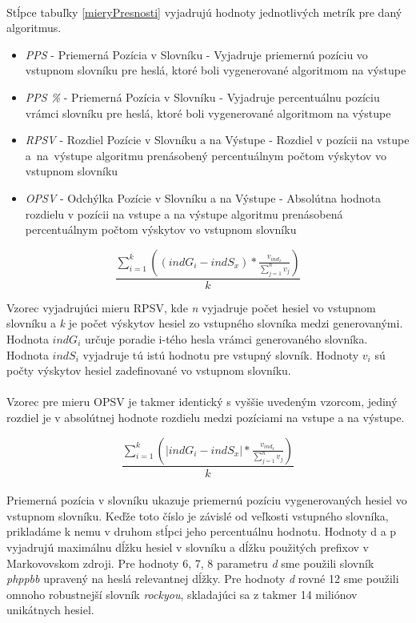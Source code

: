 \paragraph{}
Stĺpce tabuľky \ref{mieryPresnosti} vyjadrujú hodnoty jednotlivých metrík pre daný algoritmus.
\begin{itemize}
	\item \emph{PPS} - Priemerná Pozícia v Slovníku - Vyjadruje priemernú pozíciu vo vstupnom slovníku pre heslá, ktoré boli vygenerované algoritmom na výstupe
	\item \emph{PPS \%} - Priemerná Pozícia v Slovníku - Vyjadruje percentuálnu pozíciu vrámci slovníku pre heslá, ktoré boli vygenerované algoritmom na výstupe
	\item \emph{RPSV} - Rozdiel Pozície v Slovníku a na Výstupe - Rozdiel v pozícii na vstupe a~na~výstupe algoritmu prenásobený percentuálnym počtom výskytov vo vstupnom slovníku
    \item \emph{OPSV} - Odchýlka Pozície v Slovníku a na Výstupe - Absolútna hodnota rozdielu v pozícii na vstupe a na výstupe algoritmu prenásobená percentuálnym počtom výskytov vo vstupnom slovníku
\end{itemize}

\[ \frac{\displaystyle\sum_{i=1}^{k}((indG_i - indS_x) * \frac{v_{ind_x}}{\sum_{j=1}^{n}v_j})}{k} \]

Vzorec vyjadrujúci mieru RPSV, kde \emph{n} vyjadruje počet hesiel vo vstupnom slovníku a \emph{k} je počet výskytov hesiel zo vstupného slovníka medzi generovanými. Hodnota \emph{\(indG_i\)} určuje poradie i-tého hesla vrámci generovaného slovníka. Hodnota \emph{\(indS_i\)} vyjadruje tú istú hodnotu pre vstupný slovník. Hodnoty \emph{\(v_i\)} sú počty výskytov hesiel zadefinované vo vstupnom slovníku.

\paragraph{}
Vzorec pre mieru OPSV je takmer identický s vyššie uvedeným vzorcom, jediný rozdiel je v absolútnej hodnote rozdielu medzi pozíciami na vstupe a na výstupe.

\[ \frac{\displaystyle\sum_{i=1}^{k}(|indG_i - indS_x| * \frac{v_{ind_x}}{\sum_{j=1}^{n}v_j})}{k} \]

\paragraph{}
Priemerná pozícia v slovníku ukazuje priemernú pozíciu vygenerovaných hesiel vo vstupnom slovníku. Keďže toto číslo je závislé od veľkosti vstupného slovníka, prikladáme k nemu v druhom stĺpci jeho percentuálnu hodnotu. Hodnoty d a p vyjadrujú maximálnu dĺžku hesiel v slovníku a dĺžku použitých prefixov v Markovovskom zdroji. Pre hodnoty 6, 7, 8 parametru \emph{d} sme použili slovník \emph{phppbb} upravený na heslá relevantnej dĺžky. Pre hodnoty \emph{d} rovné 12 sme použili omnoho robustnejší slovník \emph{rockyou}, skladajúci sa z takmer 14 miliónov unikátnych hesiel.

